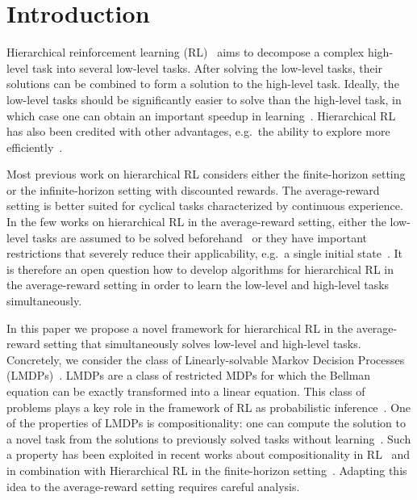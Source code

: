 \section{Introduction}

Hierarchical reinforcement learning (RL)~\citep{Dayan1992,Parr1997,Sutton1999,Dietterich2000,Barto2003} aims to decompose a complex high-level task into several low-level tasks. After solving the low-level tasks, their solutions can be combined to form a solution to the high-level task. Ideally, the low-level tasks should be significantly easier to solve than the high-level task, in which case one can obtain an important speedup in learning~\citep{Nachum2018,Wen2020}. Hierarchical RL has also been credited with other advantages, e.g.~the ability to explore more efficiently~\citep{Nachum2019}.

Most previous work on hierarchical RL considers either the finite-horizon setting or the infinite-horizon setting with discounted rewards.
The average-reward setting is better suited for cyclical tasks characterized by continuous experience.
In the few works on hierarchical RL in the average-reward setting, either the low-level tasks are assumed to be solved beforehand~\citep{Fruit2017,Fruit2017b,Wan2021a} or they %
have important restrictions that severely reduce their applicability, e.g.~a single initial state~\citep{Ghavamzadeh2007}. It is therefore an open question how to develop algorithms for hierarchical RL in the average-reward setting
in order to learn the low-level and high-level tasks simultaneously.

In this paper we propose a novel framework for hierarchical RL in the average-reward setting that simultaneously solves low-level and high-level tasks. Concretely, we consider the class of Linearly-solvable Markov Decision Processes (LMDPs)~\citep{Todorov2006}. 
LMDPs are a class of restricted MDPs for which the Bellman equation can be exactly transformed into a linear equation. This class of problems plays a key role in the framework of RL as probabilistic inference~\cite{Kappen2012,Levine2018}.
One of the properties of LMDPs is compositionality: one can compute the solution to a novel task from the solutions to previously solved tasks without learning~\citep{Todorov2009a}. 
Such a property has been exploited in recent works about compositionality in RL~\cite{Hunt2019,Niekerk2019,NangueTasse2020} and in combination with Hierarchical RL in the finite-horizon setting~\cite{Jonsson2016,Saxe2017,Infante2022}. Adapting this idea to the average-reward setting requires careful analysis.

